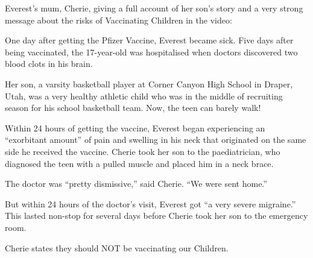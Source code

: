 Everest’s mum, Cherie, giving a full account of her son’s story and a very
strong message about the risks of Vaccinating Children in the video:

One day after getting the Pfizer Vaccine, Everest became sick. Five days after
being vaccinated, the 17-year-old was hospitalised when doctors discovered two
blood clots in his brain.

Her son, a varsity basketball player at Corner Canyon High School in Draper,
Utah, was a very healthy athletic child who was in the middle of recruiting
season for his school basketball team. Now, the teen can barely walk!

Within 24 hours of getting the vaccine, Everest began experiencing an
“exorbitant amount” of pain and swelling in his neck that originated on the same
side he received the vaccine. Cherie took her son to the paediatrician, who
diagnosed the teen with a pulled muscle and placed him in a neck brace.

The doctor was “pretty dismissive,” said Cherie. “We were sent home.”

But within 24 hours of the doctor’s visit, Everest got “a very severe migraine.”
This lasted non-stop for several days before Cherie took her son to the
emergency room.

Cherie states they should NOT be vaccinating our Children.
